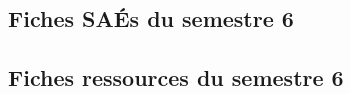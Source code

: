 



\subsection{Fiches SAÉs du semestre 6}

 \newpage
 \newpage
 \newpage
 \newpage
 \newpage
 \newpage
 \newpage

\subsection{Fiches ressources du semestre 6}

 \newpage
 \newpage
 \newpage
 \newpage
 \newpage
 \newpage
 \newpage
 \newpage